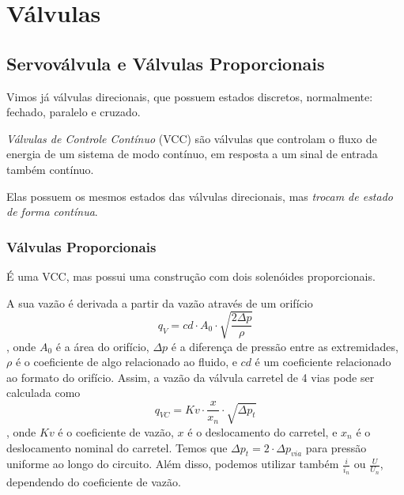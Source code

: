 
\section*{Válvulas}

\subsection*{Servoválvula e Válvulas Proporcionais}

Vimos já válvulas direcionais, que possuem estados discretos, normalmente: fechado, paralelo e cruzado.

\begin{definition}
    \emph{Válvulas de Controle Contínuo} (VCC) são válvulas que controlam o fluxo de energia de um sistema de modo contínuo, em resposta a um sinal de entrada também contínuo.
\end{definition}

Elas possuem os mesmos estados das válvulas direcionais, mas \emph{trocam de estado de forma contínua}.
 
\subsubsection*{Válvulas Proporcionais}

É uma VCC, mas possui uma construção com dois solenóides proporcionais.

A sua vazão é derivada a partir da vazão através de um orifício \[
q_V = cd\cdot A_0\cdot \sqrt{\frac{2\Delta p}{\rho}} 
\], onde $A_0$ é a área do orifício, $\Delta p$ é a diferença de pressão entre as extremidades, $\rho$ é o coeficiente de algo relacionado ao fluido, e $cd$ é um coeficiente relacionado ao formato do orifício. Assim, a vazão da válvula carretel de 4 vias pode ser calculada como \[
q_{VC} = Kv\cdot \frac{x}{x_n}\cdot \sqrt{\Delta p_t} 
\], onde $Kv$ é o coeficiente de vazão, $x$ é o deslocamento do carretel, e $x_n$ é o deslocamento nominal do carretel. Temos que $\Delta p_t = 2\cdot \Delta p_{via}$ para pressão uniforme ao longo do circuito. Além disso, podemos utilizar também $\frac{i}{i_n}$ ou $\frac{U}{U_n}$, dependendo do coeficiente de vazão.


